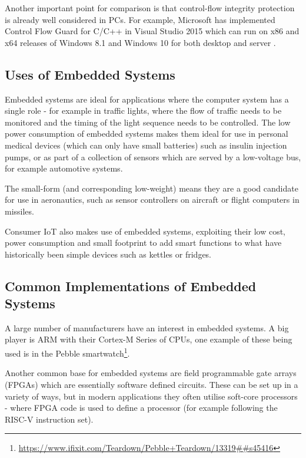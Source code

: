 Another important point for comparison is that control-flow integrity protection is already well considered in PCs. For example, Microsoft has implemented Control Flow Guard for C\slash C++ in Visual Studio 2015 which can run on x86 and x64 releases of Windows 8.1 and Windows 10 for both desktop and server \cite{MicrosoftCorporation2018}. 

\subsection{Uses of Embedded Systems}\label{usesEmbeddedSystems}

Embedded systems are ideal for applications where the computer system has a single role - for example in traffic lights, where the flow of traffic needs to be monitored and the timing of the light sequence needs to be controlled. The low power consumption of embedded systems makes them ideal for use in personal medical devices (which can only have small batteries) such as insulin injection pumps, or as part of a collection of sensors which are served by a low-voltage bus, for example automotive systems.

The small-form (and corresponding low-weight) means they are a good candidate for use in aeronautics, such as sensor controllers on aircraft or flight computers in missiles.

Consumer IoT also makes use of embedded systems, exploiting their low cost, power consumption and small footprint to add smart functions to what have historically been simple devices such as kettles or fridges.

\subsection{Common Implementations of Embedded Systems}\label{implementationsEmbeddedSystems}
A large number of manufacturers have an interest in embedded systems. A big player is ARM with their Cortex-M Series of CPUs, one example of these being used is in the Pebble smartwatch\footnote{\url{https://www.ifixit.com/Teardown/Pebble+Teardown/13319##s45416}}.

Another common base for embedded systems are field programmable gate arrays (FPGAs) which are essentially software defined circuits. These can be set up in a variety of ways, but in modern applications they often utilise soft-core processors - where FPGA code is used to define a processor (for example following the RISC-V instruction set).

